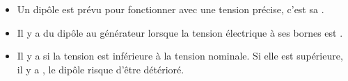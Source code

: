\begin{mybilan}
	\begin{itemize}
		\item Un dipôle est prévu pour fonctionner avec une tension précise, c'est sa .\pause
		
		\item Il y a  du dipôle au générateur lorsque la tension électrique à ses bornes est . \pause
		
		\item Il y a  si la tension est inférieure à la tension nominale. Si elle est supérieure, il y a , le dipôle risque d'être détérioré. 
	\end{itemize}
	
	
\end{mybilan}